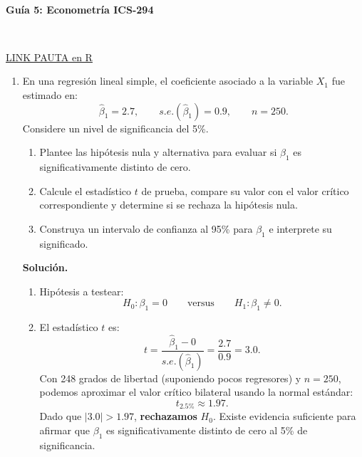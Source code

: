 \documentclass[12pt]{article}
\begin{document}
\vspace{5cm}



\begin{center}
\begin{large}
\textbf{\\Guía 5: Econometría ICS-294}
\end{large}\\
\end{center}

\href{https://colab.research.google.com/drive/1PAX_qvkKfoZjpzktfvsFLToTcGMyIl69?usp=sharing}{LINK PAUTA en R}

\begin{enumerate}
    \item En una regresión lineal simple, el coeficiente asociado a la variable
        \(X_1\) fue estimado en:
        \[
          \hat\beta_1 = 2.7,
          \qquad s.e.(\hat\beta_1) = 0.9,
          \qquad n = 250.
        \]
        Considere un nivel de significancia del 5\%.

        \begin{enumerate}
        \item Plantee las hipótesis nula y alternativa para evaluar si
                \( \beta_1 \) es significativamente distinto de cero.
          \item Calcule el estadístico \( t \) de prueba, compare su valor
                con el valor crítico correspondiente y determine si se
                rechaza la hipótesis nula.
          \item Construya un intervalo de confianza al 95\% para
                \( \beta_1 \) e interprete su significado.
        \end{enumerate}

 {\color{red}       \textbf{Solución.}
        \begin{enumerate}
          \item Hipótesis a testear:
                \[
                  H_0: \beta_1 = 0
                  \qquad\text{versus}\qquad
                  H_1: \beta_1 \neq 0.
                \]
          \item El estadístico \( t \) es:
                \[
                  t
                  = \frac{\hat\beta_1 - 0}{s.e.(\hat\beta_1)}
                  = \frac{2.7}{0.9}
                  = 3.0.
                \]
                Con 248 grados de libertad (suponiendo pocos regresores)
                y \(n = 250\), podemos aproximar el valor crítico bilateral
                usando la normal estándar:
                \[
                  t_{2.5\%} \approx 1.97.
                \]
                Dado que \(|3.0| > 1.97\), \textbf{rechazamos} \( H_0 \).
                Existe evidencia suficiente para afirmar que \( \beta_1 \) es
                significativamente distinto de cero al 5\% de significancia.


\end{enumerate}}
\end{enumerate}
\end{document}
